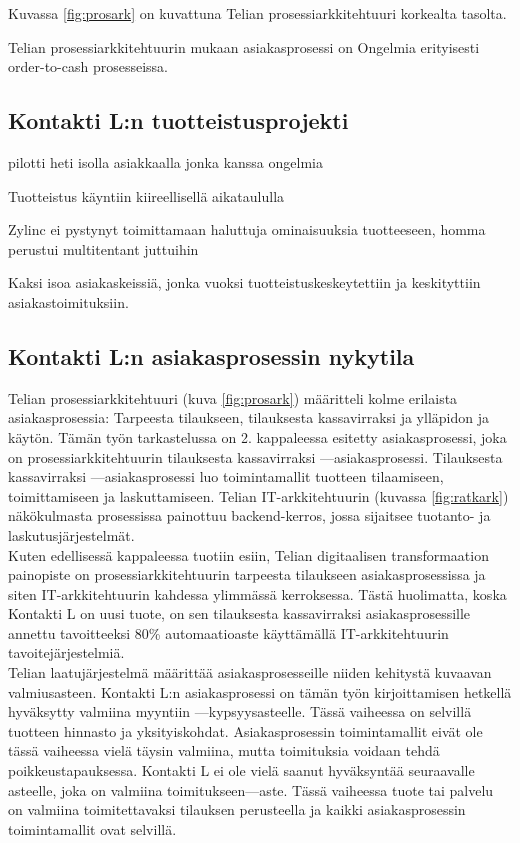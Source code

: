 \documentclass[finnish,12pt,a4paper,pdftex]{article}
\begin{document}
Kuvassa \ref{fig:prosark} on kuvattuna Telian prosessiarkkitehtuuri korkealta tasolta. 


Telian prosessiarkkitehtuurin mukaan asiakasprosessi on 
Ongelmia erityisesti order-to-cash prosesseissa.

\subsection{Kontakti L:n tuotteistusprojekti}

pilotti heti isolla asiakkaalla jonka kanssa ongelmia

Tuotteistus käyntiin kiireellisellä aikataululla

Zylinc ei pystynyt toimittamaan haluttuja ominaisuuksia tuotteeseen, homma perustui multitentant juttuihin

Kaksi isoa asiakaskeissiä, jonka vuoksi tuotteistuskeskeytettiin ja keskityttiin asiakastoimituksiin.

\subsection{Kontakti L:n asiakasprosessin nykytila}

Telian prosessiarkkitehtuuri (kuva \ref{fig:prosark}) määritteli kolme erilaista asiakasprosessia: Tarpeesta tilaukseen, tilauksesta kassavirraksi ja ylläpidon ja käytön. Tämän työn tarkastelussa on 2. kappaleessa esitetty asiakasprosessi, joka on prosessiarkkitehtuurin tilauksesta kassavirraksi —asiakasprosessi. Tilauksesta kassavirraksi —asiakasprosessi luo toimintamallit tuotteen tilaamiseen, toimittamiseen ja laskuttamiseen. Telian IT-arkkitehtuurin (kuvassa \ref{fig:ratkark}) näkökulmasta prosessissa painottuu backend-kerros, jossa sijaitsee tuotanto- ja laskutusjärjestelmät.\\

Kuten edellisessä kappaleessa tuotiin esiin, Telian digitaalisen transformaation painopiste on prosessiarkkitehtuurin tarpeesta tilaukseen asiakasprosessissa ja siten IT-arkkitehtuurin kahdessa ylimmässä kerroksessa. Tästä huolimatta, koska Kontakti L on uusi tuote, on sen tilauksesta kassavirraksi asiakasprosessille annettu tavoitteeksi 80\% automaatioaste käyttämällä IT-arkkitehtuurin tavoitejärjestelmiä.\\

Telian laatujärjestelmä määrittää asiakasprosesseille niiden kehitystä kuvaavan valmiusasteen. Kontakti L:n asiakasprosessi on tämän työn kirjoittamisen hetkellä hyväksytty valmiina myyntiin —kypsyysasteelle. Tässä vaiheessa on selvillä tuotteen hinnasto ja yksityiskohdat. Asiakasprosessin toimintamallit eivät ole tässä vaiheessa vielä täysin valmiina, mutta toimituksia voidaan tehdä poikkeustapauksessa. Kontakti L ei ole vielä saanut hyväksyntää seuraavalle asteelle, joka on valmiina toimitukseen—aste. Tässä vaiheessa tuote tai palvelu on valmiina toimitettavaksi tilauksen perusteella ja kaikki asiakasprosessin toimintamallit ovat selvillä.\\
\end{document}
